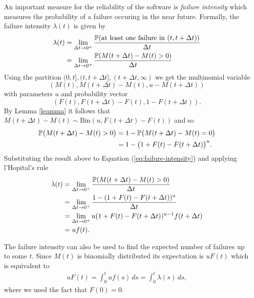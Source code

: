 An important measure for the reliability of the software is \textit{failure intensity} which measures the probability of a failure occuring in the near future. Formally, the failure intensity $\lambda(t)$ is given by
\begin{equation}\label{eq:failure-intensity}
    \begin{aligned}
    \lambda(t)&=\lim_{\Delta t\to 0^+}\frac{\mathbb{P}(\text{at least one failure in } (t, t+\Delta t))}{\Delta t}\\
    &=\lim_{\Delta t\to 0^+}\frac{\mathbb{P}(M(t+\Delta t)-M(t) > 0)}{\Delta t}
    \end{aligned}
\end{equation}
Using the partition $(0,t], (t,t+\Delta t], (t+\Delta t,\infty)$ we get the multinomial variable 
$$(M(t), M(t+\Delta t)-M(t), u-M(t+\Delta t))$$ 
with parameters $u$ and probability vector
$$(F(t), F(t+\Delta t)-F(t), 1-F(t+\Delta t)).$$ 
By Lemma \ref{leamma} it follows that $M(t+\Delta t)-M(t)\sim\text{Bin}(u, F(t+\Delta t)-F(t))$ and so
\begin{align*}
    \mathbb{P}\big(M(t+\Delta t)-M(t) > 0\big) &= 1-\mathbb{P}\big(M(t+\Delta t)-M(t)=0\big)\\
    &=1-\big(1+F(t)-F(t+\Delta t)\big)^u.
\end{align*}
Substituting the result above to Equation (\ref{eq:failure-intensity}) and applying l'Hopital's rule
\begin{align*}
     \lambda(t)&=\lim_{\Delta t\to 0^+}\frac{\mathbb{P}(M(t+\Delta t)-M(t) > 0)}{\Delta t}\\
     &=\lim_{\Delta t\to 0^+}\frac{1-(1+F(t)-F(t+\Delta t))^u}{\Delta t}\\
     &=\lim_{\Delta t\to 0^+}u(1+F(t)-F(t+\Delta t))^{u-1}f(t+\Delta t)\\
     &=uf(t).
\end{align*}

The failure intensity can also be used to find the expected number of failures up to some $t$. Since $M(t)$ is binomially distributed its expectation is $u F(t)$ which is equivalent to
\begin{align*}
    uF(t)=\int_0^t uf(s)\, ds=\int_0^t\lambda(s)\,ds,
\end{align*}
where we used the fact that $F(0)=0$.

